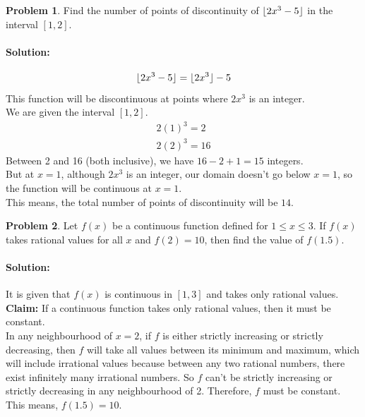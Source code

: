 \documentclass[14]{article}
\DeclarePairedDelimiter\floor{\lfloor}{\rfloor}
\theoremstyle{definition}
\newtheorem{prob}{Problem}
\theoremstyle{case}
\begin{document}
\begin{prob}
Find the number of points of discontinuity of $\floor{2x^3 - 5}$ in the interval $[1, 2]$.
\paragraph{Solution:}
\[
\floor{2x^3 - 5} = \floor{2x^3} - 5
\]
This function will be discontinuous at points where $2x^3$ is an integer.\\
We are given the interval $[1, 2]$.
\begin{align*}
2(1)^3 = 2\\
2(2)^3 = 16
\end{align*}
Between 2 and 16 (both inclusive), we have $16 - 2 + 1 = 15$ integers.\\
But at $x = 1$, although $2x^3$ is an integer, our domain doesn't go below $x = 1$, so the function will be continuous at $x = 1$.\\
This means, the total number of points of discontinuity will be $14$.
\end{prob}
\begin{prob}
Let $f(x)$ be a continuous function defined for $1 \leq x \leq 3$. If $f(x)$ takes rational values for all $x$ and $f(2) = 10$, then find the value of $f(1.5)$.
\paragraph{Solution:} It is given that $f(x)$ is continuous in $[1, 3]$ and takes only rational values.\\
\textbf{Claim: } If a continuous function takes only rational values, then it must be constant.\\
In any neighbourhood of $x = 2$, if $f$ is either strictly increasing or strictly decreasing, then $f$ will take all values between its minimum and maximum, which will include irrational values because between any two rational numbers, there exist infinitely many irrational numbers. So $f$ can't be strictly increasing or strictly decreasing in any neighbourhood of 2. Therefore, $f$ must be constant.\\
This means, $f(1.5) = 10$.
\end{prob}
\pagebreak
\end{document}
